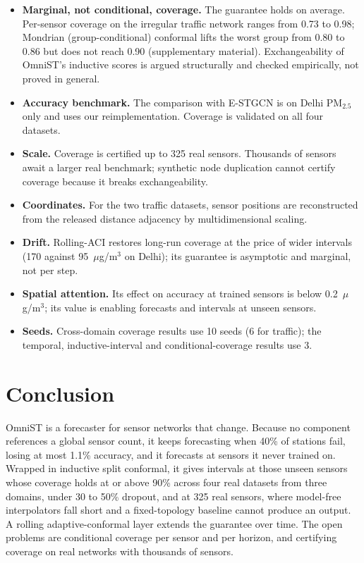 \documentclass[journal]{IEEEtran}
\begin{document}
\begin{itemize}
\item \textbf{Marginal, not conditional, coverage.} The guarantee holds on average. Per-sensor
coverage on the irregular traffic network ranges from 0.73 to 0.98; Mondrian (group-conditional)
conformal lifts the worst group from 0.80 to 0.86 but does not reach 0.90 (supplementary material).
Exchangeability of OmniST's inductive scores is argued structurally and checked empirically, not
proved in general.
\item \textbf{Accuracy benchmark.} The comparison with E-STGCN is on Delhi PM$_{2.5}$ only and uses
our reimplementation. Coverage is validated on all four datasets.
\item \textbf{Scale.} Coverage is certified up to 325 real sensors. Thousands of sensors await a larger
real benchmark; synthetic node duplication cannot certify coverage because it breaks exchangeability.
\item \textbf{Coordinates.} For the two traffic datasets, sensor positions are reconstructed from the
released distance adjacency by multidimensional scaling.
\item \textbf{Drift.} Rolling-ACI restores long-run coverage at the price of wider intervals (170
against 95~$\mu$g/m$^3$ on Delhi); its guarantee is asymptotic and marginal, not per step.
\item \textbf{Spatial attention.} Its effect on accuracy at trained sensors is below
0.2~$\mu$g/m$^3$; its value is enabling forecasts and intervals at unseen sensors.
\item \textbf{Seeds.} Cross-domain coverage results use 10 seeds (6 for traffic); the temporal,
inductive-interval and conditional-coverage results use 3.
\end{itemize}

\section{Conclusion}
\label{sec:conclusion}

OmniST is a forecaster for sensor networks that change. Because no component references a global
sensor count, it keeps forecasting when 40\% of stations fail, losing at most 1.1\% accuracy, and it
forecasts at sensors it never trained on. Wrapped in inductive split conformal, it gives intervals at
those unseen sensors whose coverage holds at or above 90\% across four real datasets from three
domains, under 30 to 50\% dropout, and at 325 real sensors, where model-free interpolators fall short
and a fixed-topology baseline cannot produce an output. A rolling adaptive-conformal layer extends the
guarantee over time. The open problems are conditional coverage per sensor and per horizon, and
certifying coverage on real networks with thousands of sensors.
\end{document}
